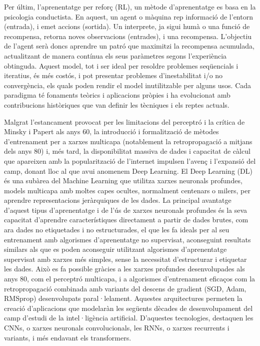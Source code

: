 \documentclass[a4paper,11pt, titlepage, twoside]{article}
\begin{document}
Per últim, l'aprenentatge per reforç (RL), un mètode d'aprenentatge es basa en la psicologia conductista. En aquest, un agent o màquina rep informació de l'entorn (entrada), i emet accions (sortida). Un interprete, ja sigui humà o una funció de recompensa, retorna noves observacions (entrades), i una recompensa. L'objectiu de l'agent serà doncs aprendre un patró que maximitzi la recompensa acumulada, actualitzant de manera contínua els seus paràmetres segons l'experiència obtinguda. Aquest model, tot i ser ideal per resoldre problemes seqüencials i iteratius, és més costós, i pot presentar problemes d'inestabilitat i/o no convergència, els quals poden rendir el model inutilitzable per alguns usos.
Cada paradigma té fonaments teòrics i aplicacions pròpies i ha evolucionat amb contribucions històriques que van definir les tècniques i els reptes actuals.

Malgrat l'estancament provocat per les limitacions del perceptró i la crítica de Minsky i Papert als anys 60, la introducció i formalització de mètodes d'entrenament per a xarxes multicapa (notablement la retropropagació a mitjans dels anys 80) i, més tard, la disponibilitat massiva de dades i capacitat de càlcul que apareixen amb la popularització de l'internet impulsen l'avenç i l'expansió del camp, donant lloc al que avui anomenem Deep Learning.
El Deep Learning (DL) és una subàrea del Machine Learning que utilitza xarxes neuronals profundes, models multicapa amb moltes capes ocultes, normalment centenars o milers, per aprendre representacions jeràrquiques de les dades. La principal avantatge d'aquest tipus d'aprenentatge i de l'ús de xarxes neuronals profundes és la seva capacitat d'aprendre característiques directament a partir de dades brutes, com ara dades no etiquetades i no estructurades, el que les fa ideals per al seu entrenament amb algorismes d'aprenentatge no supervisat, aconseguint resultats similars als que es poden aconseguir utilitzant algorismes d'aprenentatge supervisat amb xarxes més simples, sense la necessitat d'estructurar i etiquetar les dades. Això es fa possible gràcies a les xarxes profundes desenvolupades als anys 80, com el perceptró multicapa, i a algorismes d'entrenament eficaços com la retropropagació combinada amb variants del descens de gradient (SGD, Adam, RMSprop) desenvolupats paral·lelament. Aquestes arquitectures permeten la creació d'aplicacions que modelaràn les següents dècades de desenvolupament del camp d'estudi de la intel·ligència artificial. D'aquestes tecnologies, destaquen les CNNs, o xarxes neuronals convolucionals, les RNNs, o xarxes recurrents i variants, i més endavant els transformers.
\end{document}
